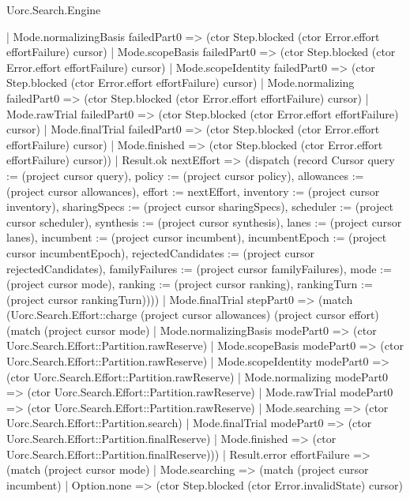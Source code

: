 \begin{lexlean}{Uorc.Search.Engine}
\begin{semanticmodule}
{        | Mode.normalizingBasis failedPart0 => (ctor Step.blocked (ctor Error.effort effortFailure) cursor)
        | Mode.scopeBasis failedPart0 => (ctor Step.blocked (ctor Error.effort effortFailure) cursor)
        | Mode.scopeIdentity failedPart0 => (ctor Step.blocked (ctor Error.effort effortFailure) cursor)
        | Mode.normalizing failedPart0 => (ctor Step.blocked (ctor Error.effort effortFailure) cursor)
        | Mode.rawTrial failedPart0 => (ctor Step.blocked (ctor Error.effort effortFailure) cursor)
        | Mode.finalTrial failedPart0 => (ctor Step.blocked (ctor Error.effort effortFailure) cursor)
        | Mode.finished => (ctor Step.blocked (ctor Error.effort effortFailure) cursor))
      | Result.ok nextEffort => (dispatch (record Cursor {query := (project cursor query), policy := (project cursor policy), allowances := (project cursor allowances), effort := nextEffort, inventory := (project cursor inventory), sharingSpecs := (project cursor sharingSpecs), scheduler := (project cursor scheduler), synthesis := (project cursor synthesis), lanes := (project cursor lanes), incumbent := (project cursor incumbent), incumbentEpoch := (project cursor incumbentEpoch), rejectedCandidates := (project cursor rejectedCandidates), familyFailures := (project cursor familyFailures), mode := (project cursor mode), ranking := (project cursor ranking), rankingTurn := (project cursor rankingTurn)})))
    | Mode.finalTrial stepPart0 => (match (Uorc.Search.Effort::charge (project cursor allowances) (project cursor effort) (match (project cursor mode)
        | Mode.normalizingBasis modePart0 => (ctor Uorc.Search.Effort::Partition.rawReserve)
        | Mode.scopeBasis modePart0 => (ctor Uorc.Search.Effort::Partition.rawReserve)
        | Mode.scopeIdentity modePart0 => (ctor Uorc.Search.Effort::Partition.rawReserve)
        | Mode.normalizing modePart0 => (ctor Uorc.Search.Effort::Partition.rawReserve)
        | Mode.rawTrial modePart0 => (ctor Uorc.Search.Effort::Partition.rawReserve)
        | Mode.searching => (ctor Uorc.Search.Effort::Partition.search)
        | Mode.finalTrial modePart0 => (ctor Uorc.Search.Effort::Partition.finalReserve)
        | Mode.finished => (ctor Uorc.Search.Effort::Partition.finalReserve)))
      | Result.error effortFailure => (match (project cursor mode)
        | Mode.searching => (match (project cursor incumbent)
          | Option.none => (ctor Step.blocked (ctor Error.invalidState) cursor)
}
\end{semanticmodule}
\end{lexlean}
